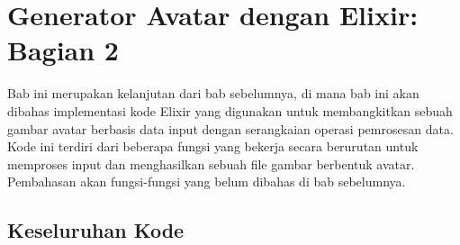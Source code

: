 \chapter{Generator Avatar dengan Elixir: Bagian 2}

Bab ini merupakan kelanjutan dari bab sebelumnya, di mana bab ini akan dibahas implementasi kode Elixir yang digunakan untuk membangkitkan sebuah gambar avatar berbasis data input dengan serangkaian operasi pemrosesan data. Kode ini terdiri dari beberapa fungsi yang bekerja secara berurutan untuk memproses input dan menghasilkan sebuah file gambar berbentuk avatar. Pembahasan akan fungsi-fungsi yang belum dibahas di bab sebelumnya.


\section{Keseluruhan Kode}

